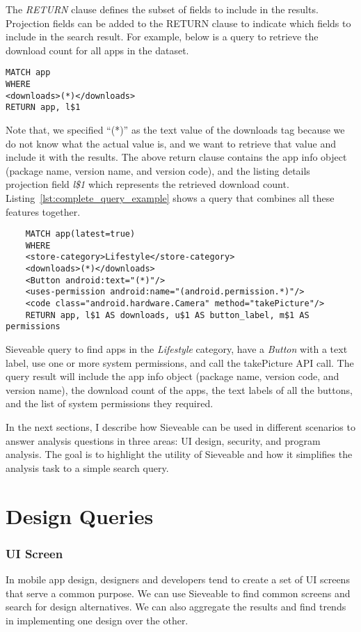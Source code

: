 The \textit{RETURN} clause defines the subset of fields to include in the results.
Projection fields can be added to the RETURN clause to indicate which fields to include in the search result.
For example, below is a query to retrieve the download count for all apps in the dataset.
\begin{verbatim}
MATCH app
WHERE
<downloads>(*)</downloads>
RETURN app, l$1
\end{verbatim}
Note that, we specified ``(*)'' as the text value of the downloads tag because we do not know what the actual value is, and we want to retrieve that value and include it with the results.
The above return clause contains the app info object (package name, version name, and version code), and the listing details projection field \textit{l\$1} which represents the retrieved download count.
Listing~\ref{lst:complete_query_example} shows a query that combines all these features together.
\begin{listing}[ht]
	\begin{verbatim}
	MATCH app(latest=true)
	WHERE
	<store-category>Lifestyle</store-category>
	<downloads>(*)</downloads>
	<Button android:text="(*)"/>
	<uses-permission android:name="(android.permission.*)"/>
	<code class="android.hardware.Camera" method="takePicture"/>
	RETURN app, l$1 AS downloads, u$1 AS button_label, m$1 AS permissions
	\end{verbatim}
	\caption{Sieveable query to find apps in the \textit{Lifestyle} category, have a \textit{Button} with a text label, use one or more system permissions, and call the takePicture API call. The query result will include the app info object (package name, version code, and version name), the download count of the apps, the text labels of all the buttons, and the list of system permissions they required.}
	\label{lst:complete_query_example}
\end{listing}

In the next sections, I describe how Sieveable can be used in different scenarios to answer analysis questions in three areas: UI design, security, and program analysis.
The goal is to highlight the utility of Sieveable and how it simplifies the analysis task to a simple search query. 

\section{Design Queries}
\subsubsection{UI Screen}
In mobile app design, designers and developers tend to create a set of UI screens that serve a common purpose. 
We can use Sieveable to find common screens and search for design alternatives.
We can also aggregate the results and find trends in implementing one design over the other.

